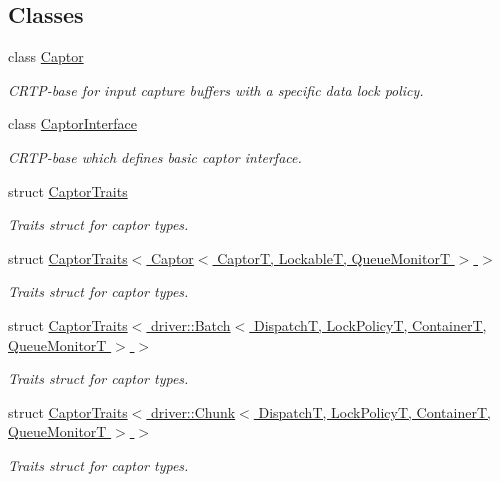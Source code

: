\subsection*{Classes}
\begin{DoxyCompactItemize}
\item 
class \hyperlink{classflow_1_1_captor}{Captor}
\begin{DoxyCompactList}\small\item\em C\+R\+T\+P-\/base for input capture buffers with a specific data lock policy. \end{DoxyCompactList}\item 
class \hyperlink{classflow_1_1_captor_interface}{Captor\+Interface}
\begin{DoxyCompactList}\small\item\em C\+R\+T\+P-\/base which defines basic captor interface. \end{DoxyCompactList}\item 
struct \hyperlink{structflow_1_1_captor_traits}{Captor\+Traits}
\begin{DoxyCompactList}\small\item\em Traits struct for captor types. \end{DoxyCompactList}\item 
struct \hyperlink{structflow_1_1_captor_traits_3_01_captor_3_01_captor_t_00_01_lockable_t_00_01_queue_monitor_t_01_4_01_4}{Captor\+Traits$<$ Captor$<$ Captor\+T, Lockable\+T, Queue\+Monitor\+T $>$ $>$}
\begin{DoxyCompactList}\small\item\em Traits struct for captor types. \end{DoxyCompactList}\item 
struct \hyperlink{structflow_1_1_captor_traits_3_01driver_1_1_batch_3_01_dispatch_t_00_01_lock_policy_t_00_01_contfc7418d386a7a1cb1fa7e6bb1299634a}{Captor\+Traits$<$ driver\+::\+Batch$<$ Dispatch\+T, Lock\+Policy\+T, Container\+T, Queue\+Monitor\+T $>$ $>$}
\begin{DoxyCompactList}\small\item\em Traits struct for captor types. \end{DoxyCompactList}\item 
struct \hyperlink{structflow_1_1_captor_traits_3_01driver_1_1_chunk_3_01_dispatch_t_00_01_lock_policy_t_00_01_contf25136d799b84e6e744301cf371fdfc2}{Captor\+Traits$<$ driver\+::\+Chunk$<$ Dispatch\+T, Lock\+Policy\+T, Container\+T, Queue\+Monitor\+T $>$ $>$}
\begin{DoxyCompactList}\small\item\em Traits struct for captor types. \end{DoxyCompactList}\item 

\end{DoxyCompactItemize}
